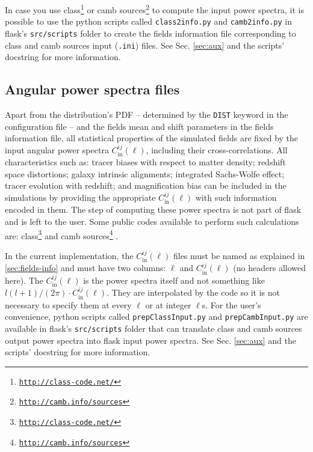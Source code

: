 \documentclass[12pt]{book} %
\newcommand{\nv}[1]{\mathrm{#1}}                 %
\begin{document}
In case you use {\sc class}\footnote{\tt{\href{http://class-code.net/}{http://class-code.net/}}} 
\citep{Blas11x, Dio13x} or 
{\sc camb sources}\footnote{\tt{\href{http://camb.info/sources}{http://camb.info/sources}}}
\citep{Challinor11x} to compute the input power spectra, it is possible to use the 
{\sc python} scripts called {\tt class2info.py} and {\tt camb2info.py} in {\sc flask}'s 
{\tt src/scripts} folder to create the fields information file corresponding to {\sc class} and 
{\sc camb sources} input ({\tt .ini}) files. See Sec. \ref{sec:aux} and the scripts' docstring for more information.

\subsection{Angular power spectra files}
\label{sec:cls}

Apart from the distribution's PDF -- determined by the {\tt DIST} keyword in 
the configuration file -- and the fields mean and shift parameters in the fields 
information file, all statistical properties of the simulated fields are fixed 
by the input angular power spectra $C_{\nv{in}}^{ij}(\ell)$, including their 
cross-correlations. All characteristics 
such as: tracer biases with respect to matter density; redshift space distortions; 
galaxy intrinsic alignments; integrated Sachs-Wolfe effect; tracer evolution with 
redshift; and magnification bias can be included in the simulations by providing the 
appropriate $C_{\nv{in}}^{ij}(\ell)$ with such information encoded in them. The 
step of computing these power spectra is not part of {\sc flask} and is left to the user. 
Some public codes available to perform such calculations are: 
{\sc class}\footnote{\tt{\href{http://class-code.net/}{http://class-code.net/}}} 
\citep{Blas11x, Dio13x} and 
{\sc camb sources}\footnote{\tt{\href{http://camb.info/sources}{http://camb.info/sources}}}
\citep{Challinor11x}.

In the current implementation, the $C_{\nv{in}}^{ij}(\ell)$ files must be named as explained in 
\ref{sec:fields-info} and must have two columns: $\ell$ and $C_{\nv{in}}^{ij}(\ell)$ (no headers 
allowed here). The $C_{\nv{in}}^{ij}(\ell)$ is the power spectra itself and not something like 
$l(l+1)/(2\pi)\cdot C_{\nv{in}}^{ij}(\ell)$. They are interpolated by the code so it is not necessary 
to specify them at every $\ell$ or at integer $\ell$s. For the user's convenience, {\sc python} 
scripts called {\tt prepClassInput.py} and {\tt prepCambInput.py} are available in {\sc flask}'s 
{\tt src/scripts} folder that can translate {\sc class} and {\sc camb sources} output power spectra 
into {\sc flask} input power spectra. See Sec. \ref{sec:aux} and the scripts' docstring for more information. 
\end{document}
